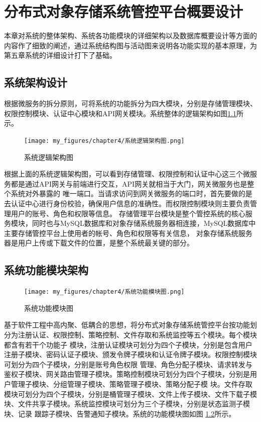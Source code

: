 \chapter{分布式对象存储系统管控平台概要设计}


本章对系统的整体架构、系统各功能模块的详细架构以及数据库概要设计等方面的内容作了细致的阐述，通过系统结构图与活动图来说明各功能实现的基本原理，为第五章系统的详细设计打下了基础。


\section{系统架构设计}

根据微服务的拆分原则，可将系统的功能拆分为四大模块，分别是存储管理模块、权限控制模块、认证中心模块和API网关模块。系统整体的逻辑架构如图\ref{fig:系统逻辑架构图}所示。
\begin{figure}[h]
    \centering
    \texttt{[image: my\_figures/chapter4/系统逻辑架构图.png]}
    \caption{系统逻辑架构图}
    \label{fig:系统逻辑架构图}
\end{figure}

根据上面的系统逻辑架构图，可以看到存储管理、权限控制和认证中心这三个微服务都是通过API网关与前端进行交互，API网关就相当于大门，网关微服务也是整个系统对外暴露的
唯一端口。当请求访问到网关微服务的端口时，首先要做的是去认证中心进行身份校验，确保用户信息的准确性。而权限控制模块则主要负责管理用户的账号、角色和权限等信息。
存储管理平台模块是整个管控系统的核心服务模块，同时也与MySQL数据库和对象存储系统服务器相连接，MySQL数据库中主要存储管控平台上使用者的帐号、角色和权限等有关信息，
对象存储系统服务器是用户上传或下载文件的位置，是整个系统最关键的部分。

\section{系统功能模块架构}

\begin{figure}[h]
    \centering
    \texttt{[image: my\_figures/chapter4/系统功能模块图.png]}
    \caption{系统功能模块图}
    \label{fig:系统功能模块图}
\end{figure}

基于软件工程中高内聚、低耦合的思想，将分布式对象存储系统管控平台按功能划分为注册认证、权限控制、策略控制、文件存取和系统监控等五个模块。每个模块都含有若干个功能子
模块，注册认证模块可划分为四个子模块，分别是包含用户注册子模块、密码认证子模块、颁发令牌子模块和认证令牌子模块。权限控制模块可划分为四个子模块，分别是账号角色权限
管理、角色分配子模块、请求转发与鉴权子模块、网关路由管理子模块。策略控制模块可划分为四个子模块，分别是用户管理子模块、分组管理子模块、策略管理子模块、策略分配子模
块。文件存取模块可划分为四个子模块，分别是桶管理子模块、文件上传子模块、文件下载子模块、文件共享子模块。系统监控模块可划分为三个子模块，分别是状态监测子模块、记录
跟踪子模块、告警通知子模块。系统的功能模块图如图 \ref{fig:系统功能模块图}所示。

